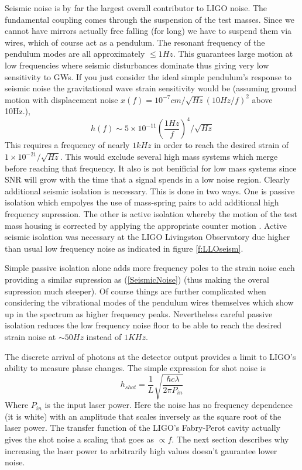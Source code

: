Seismic noise is by far the largest overall contributor to LIGO 
noise.  The fundamental coupling comes through the suspension
of the test masses.  Since we cannot have mirrors actually free falling (for long) we have to suspend them via wires, which of course act as a pendulum.  The resonant
frequency of the pendulum modes are all approximately $\leq 1Hz$.  This guarantees
large motion at low frequencies where seismic disturbances
dominate thus giving very low sensitivity to GWs.
If you just consider the ideal simple pendulum's response to 
seismic noise the gravitational wave strain sensitivity would
be \cite{Saulson} (assuming ground motion with displacement
noise $x(f) = 10^{-7}cm/\sqrt{Hz}(10Hz/f)^2$ above 10Hz.),
\begin{equation}
\label{SeismicNoise}
h(f) \sim 5 \times 10^{-11}{\left(\frac{1Hz}{f}\right)}^4 /\sqrt{Hz}
\end{equation}
This requires a frequency of nearly $1kHz$ in order to reach
the desired strain of $1\times10^{-21}/\sqrt{Hz}$\cite{Saulson}.  This would exclude several high mass systems
which merge before reaching that frequency.  It also is
not benificial for low mass systems since SNR will grow
with the time that a signal spends in a low noise region.  Clearly
additional seismic isolation is necessary.  This is done in
two ways.  One is passive isolation which empolyes the use
of mass-spring pairs to add additional high frequency 
supression.  The other is active isolation whereby
the motion of the test mass housing is corrected by applying
the appropriate counter motion \cite{HEPI}.  Active seismic
isolation was necessary at the LIGO Livingston Observatory 
due higher than usual low frequency noise as indicated in
figure \ref{f:LLOseism}. 

Simple passive isolation alone adds more frequency poles
to the strain noise each providing a similar supression as
(\ref{SeismicNoise}) (thus making the overal supression much
steeper).  Of course things are further complicated
when considering the vibrational modes of the pendulum
wires themselves which show up in the spectrum as 
higher frequency peaks.  Nevertheless careful passive isolation
reduces the low frequency noise floor to be able to reach
the desired strain noise at $\sim 50Hz$ instead of $1KHz$.

The discrete arrival of photons at the detector output provides
a limit to LIGO's ability to measure phase changes.  The simple
expression for shot noise is \cite{Saulson}
\begin{equation}
h_{shot} = \frac{1}{L}\sqrt{\frac{\hbar c\lambda}{2\pi P_{in}}}
\end{equation}
Where $P_{in}$  is the input laser power.  Here the noise
has no frequency dependence (it is white) with an amplitude that scales inversely as the square root of the laser power.  
The transfer function of the LIGO's Fabry-Perot cavity actually
gives the shot noise a scaling that goes as $\propto f$. The
next section describes why increasing the laser power to
arbitrarily high values doesn't gaurantee lower noise.

